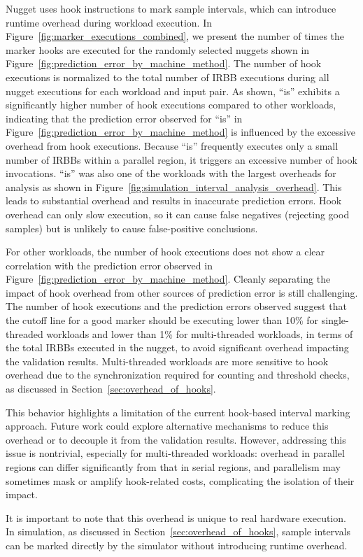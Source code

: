Nugget uses hook instructions to mark sample intervals, which can introduce runtime overhead during workload execution.
In Figure~\ref{fig:marker_executions_combined}, we present the number of times the marker hooks are executed for the randomly selected nuggets shown in Figure~\ref{fig:prediction_error_by_machine_method}.
The number of hook executions is normalized to the total number of IRBB executions during all nugget executions for each workload and input pair.
As shown, ``is'' exhibits a significantly higher number of hook executions compared to other workloads, indicating that the prediction error observed for ``is'' in Figure~\ref{fig:prediction_error_by_machine_method} is influenced by the excessive overhead from hook executions.
Because ``is'' frequently executes only a small number of IRBBs within a parallel region, it triggers an excessive number of hook invocations.
``is'' was also one of the workloads with the largest overheads for analysis as shown in Figure~\ref{fig:simulation_interval_analysis_overhead}.
This leads to substantial overhead and results in inaccurate prediction errors.
Hook overhead can only slow execution, so it can cause false negatives (rejecting good samples) but is unlikely to cause false-positive conclusions.

For other workloads, the number of hook executions does not show a clear correlation with the prediction error observed in Figure~\ref{fig:prediction_error_by_machine_method}.
Cleanly separating the impact of hook overhead from other sources of prediction error is still challenging.
The number of hook executions and the prediction errors observed suggest that the cutoff line for a good marker should be executing lower than 10\% for single-threaded workloads and lower than 1\% for multi-threaded workloads, in terms of the total IRBBs executed in the nugget, to avoid significant overhead impacting the validation results.
Multi-threaded workloads are more sensitive to hook overhead due to the synchronization required for counting and threshold checks, as discussed in Section~\ref{sec:overhead_of_hooks}.

This behavior highlights a limitation of the current hook-based interval marking approach.
Future work could explore alternative mechanisms to reduce this overhead or to decouple it from the validation results.
However, addressing this issue is nontrivial, especially for multi-threaded workloads: overhead in parallel regions can differ significantly from that in serial regions, and parallelism may sometimes mask or amplify hook-related costs, complicating the isolation of their impact.

It is important to note that this overhead is unique to real hardware execution.
In simulation, as discussed in Section~\ref{sec:overhead_of_hooks}, sample intervals can be marked directly by the simulator without introducing runtime overhead.
